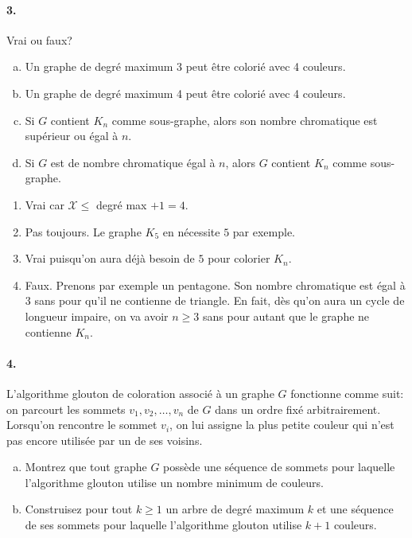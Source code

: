 \paragraph{3. } Vrai ou faux? \\
\begin{enumerate}[(a)]
  \item Un graphe de degré maximum 3 peut être colorié avec 4 couleurs.
  \item Un graphe de degré maximum 4 peut être colorié avec 4 couleurs.
  \item Si $G$ contient $K_n$ comme sous-graphe, alors son nombre chromatique est supérieur ou égal à $n$.
  \item Si $G$ est de nombre chromatique égal à $n$, alors $G$ contient $K_n$ comme sous-graphe.
\end{enumerate}

\begin{solution}
  \begin{enumerate}
    \item Vrai car $\mathcal{X} \leq$ degré max $+ 1 = 4$. 
    \item  Pas toujours. Le graphe $K_5$ en nécessite $5$ par exemple.
    \item Vrai puisqu'on aura déjà besoin de $5$ pour colorier $K_n$.
    \item Faux. Prenons par exemple un pentagone. Son nombre chromatique est égal à $3$ sans pour qu'il ne contienne de triangle. En fait, dès qu'on aura un cycle de longueur impaire, on va avoir $n \geq 3 $ sans pour autant que le graphe ne contienne $K_n$.
  \end{enumerate}
\end{solution}

\paragraph{4. } L'algorithme glouton de coloration associé à un graphe $G$ fonctionne comme suit: on parcourt les sommets $v_1,v_2,…,v_n$ de $G$ dans un ordre fixé arbitrairement. Lorsqu'on rencontre le sommet $v_i$, on lui assigne la plus petite couleur qui n'est pas encore utilisée par un de ses voisins.
\begin{enumerate}[(a)]
  \item Montrez que tout graphe $G$ possède une séquence de sommets pour laquelle l'algorithme glouton utilise un nombre minimum de couleurs.
  \item Construisez pour tout $k \geq 1$ un arbre de degré maximum $k$ et une séquence de ses sommets pour laquelle l'algorithme glouton utilise $k+1$ couleurs.
\end{enumerate}

